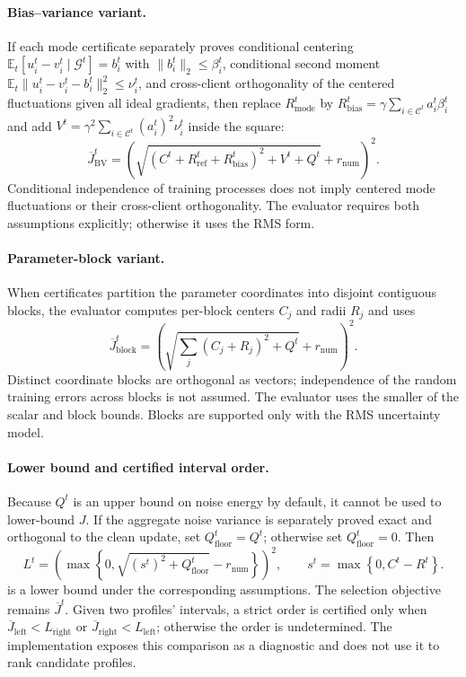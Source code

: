 \documentclass[5p,times]{elsarticle}
\theoremstyle{plain}
\theoremstyle{definition}
\theoremstyle{remark}
\begin{document}
\paragraph{Bias--variance variant.}
If each mode certificate separately proves conditional centering
$\mathbb E_t[u_i^t-v_i^t\mid\mathcal G^t]=b_i^t$ with
$\|b_i^t\|_2\le\beta_i^t$, conditional second moment
$\mathbb E_t\|u_i^t-v_i^t-b_i^t\|_2^2\le\nu_i^t$, and cross-client
orthogonality of the centered fluctuations given all ideal gradients,
then replace $R_{\mathrm{mode}}^t$ by
$R_{\mathrm{bias}}^t=\gamma\sum_{i\in\mathcal C^t}a_i^t\beta_i^t$ and
add $V^t=\gamma^2\sum_{i\in\mathcal C^t}(a_i^t)^2\nu_i^t$ inside the
square:
\begin{equation}
\overline J_{\mathrm{BV}}^t
=\left(
\sqrt{\left(C^t+R_{\mathrm{ref}}^t+R_{\mathrm{bias}}^t\right)^2
+V^t+Q^t}
+r_{\mathrm{num}}
\right)^2.
\label{eq:app_online_bv}
\end{equation}
Conditional independence of training processes does not imply centered
mode fluctuations or their cross-client orthogonality. The evaluator
requires both assumptions explicitly; otherwise it uses the RMS form.

\paragraph{Parameter-block variant.}
When certificates partition the parameter coordinates into disjoint
contiguous blocks, the evaluator computes per-block centers $C_j$ and
radii $R_j$ and uses
\begin{equation}
\overline J_{\mathrm{block}}^t
=\left(
\sqrt{\sum_j\left(C_j+R_j\right)^2+Q^t}
+r_{\mathrm{num}}
\right)^2.
\label{eq:app_online_block}
\end{equation}
Distinct coordinate blocks are orthogonal as vectors; independence of
the random training errors across blocks is not assumed. The evaluator
uses the smaller of the scalar and block bounds. Blocks are supported
only with the RMS uncertainty model.

\paragraph{Lower bound and certified interval order.}
Because $Q^t$ is an upper bound on noise energy by default, it cannot be
used to lower-bound $J$. If the aggregate noise variance is separately
proved exact and orthogonal to the clean update, set
$Q_{\mathrm{floor}}^t=Q^t$; otherwise set
$Q_{\mathrm{floor}}^t=0$. Then
\begin{equation}
L^t=
\left(
\max\left\{0,\sqrt{\left(s^t\right)^2+Q_{\mathrm{floor}}^t}
-r_{\mathrm{num}}\right\}
\right)^2,
\qquad
s^t=\max\left\{0,C^t-R^t\right\}.
\label{eq:app_online_lower}
\end{equation}
is a lower bound under the corresponding assumptions.
The selection objective remains $\overline J^t$. Given two profiles'
intervals, a strict order is certified only when
$\overline J_{\mathrm{left}}<L_{\mathrm{right}}$ or
$\overline J_{\mathrm{right}}<L_{\mathrm{left}}$; otherwise the order
is undetermined. The implementation exposes this comparison as a
diagnostic and does not use it to rank candidate profiles.
\end{document}
